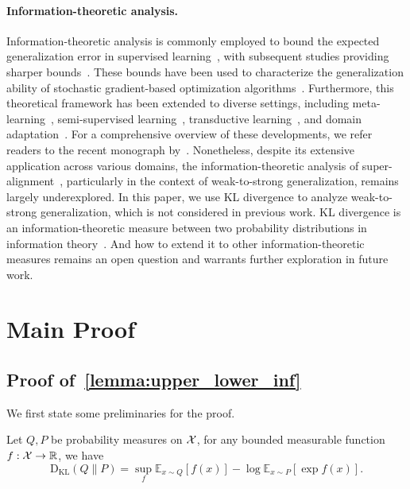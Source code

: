 \paragraph{Information-theoretic analysis.}
Information-theoretic analysis is commonly employed to bound the expected generalization error in supervised learning~\citep{russo2016controlling,xu2017information}, with subsequent studies providing sharper bounds~\citep{bu2020tightening,wang2023tighter}. 
These bounds have been used to characterize the generalization ability of stochastic gradient-based optimization algorithms~\citep{pensia2018generalization}. 
Furthermore, this theoretical framework has been extended to diverse settings, including meta-learning~\citep{chen2021generalization}, semi-supervised learning~\citep{aminian2022information}, transductive learning~\citep{tang2023information}, and domain adaptation~\citep{wang2022information}. 
For a comprehensive overview of these developments, we refer readers to the recent monograph by~\citet{hellstrom2023generalization}. 
Nonetheless, despite its extensive application across various domains, the information-theoretic analysis of super-alignment~\citep{openai_superalignment}, particularly in the context of weak-to-strong generalization, remains largely underexplored.
In this paper, we use KL divergence to analyze weak-to-strong generalization, which is not considered in previous work. 
KL divergence is an information-theoretic measure between two probability distributions in information theory~\citep{cover1999elements}.
And how to extend it to other information-theoretic measures remains an open question and warrants further exploration in future work.









\section{Main Proof}


\subsection{Proof of~\cref{lemma:upper_lower_inf}} \label{proof_lemma_inf}

We first state some preliminaries for the proof.

\begin{lemma} \label{lemma:donsker}
Let $Q, P$ be probability measures on $\mathcal{X}$, for any bounded measurable function $f: \mathcal{X} \rightarrow \mathbb{R}$, we have $$\mathrm{D}_{\mathrm{KL}}(Q \| P)=\sup _f \mathbb{E}_{x \sim Q}[f(x)]-\log \mathbb{E}_{x \sim P}[\exp f(x)].$$
\end{lemma}


